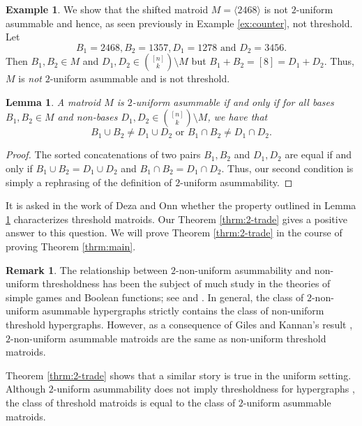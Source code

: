 \documentclass{amsart}
\theoremstyle{definition}
\newtheorem{remark}[defn]{Remark}
\newtheorem{example}[defn]{Example}
\theoremstyle{plain}
\newtheorem{lemma}[defn]{Lemma}
\begin{document}
\begin{example}
We show that the shifted matroid $M=\langle 2468 \rangle$ is not $2$-uniform asummable and hence, as seen previously in Example \ref{ex:counter}, not threshold. Let
\[B_1= 2468, B_2= 1357, D_1=1278 \text{ and } D_2=3456. \]
Then $B_1,B_2 \in M$ and $D_1,D_2 \in \binom{[n]}{k}\setminus M$ but $B_1+B_2 = [8]=D_1+D_2$. Thus, $M$ is \emph{not} $2$-uniform asummable and is not threshold. 
\end{example}

\begin{lemma}
\label{lem:ele}
A matroid $M$ is $2$-uniform asummable if and only if for all bases $B_1,B_2\in M$ and non-bases $D_1,D_2\in \binom{[n]}{k}\setminus M$, we have that
\[B_1\cup B_2 \neq D_1\cup D_2 \text{ or } B_1\cap B_2 \neq D_1 \cap D_2. \]
\end{lemma}
\begin{proof}
The sorted concatenations of two pairs $B_1,B_2$ and $D_1,D_2$ are equal if and only if $B_1 \cup B_2 = D_1\cup D_2$ and $B_1\cap B_2 = D_1\cap D_2$. Thus, our second condition is simply a rephrasing of the definition of $2$-uniform asummability. 
\end{proof}

It is asked in the work of Deza and Onn \cite[Question $1.1$]{DO} whether the property outlined in Lemma \ref{lem:ele} characterizes threshold matroids. Our Theorem \ref{thrm:2-trade} gives a positive answer to this question. We will prove Theorem \ref{thrm:2-trade} in the course of proving Theorem \ref{thrm:main}. 

\begin{remark}
  The relationship between $2$-non-uniform asummability and non-uniform thresholdness has been the subject of much study in the theories of simple games and Boolean functions; see \cite[Section $2.7$]{TZ} and \cite[Section $9.3$]{Boolean}. In general, the class of $2$-non-uniform asummable hypergraphs strictly contains the class of non-uniform threshold hypergraphs. However, as a consequence of Giles and Kannan's result \cite{GK}, $2$-non-uniform asummable matroids are the same as non-uniform threshold matroids.

  Theorem \ref{thrm:2-trade} shows that a similar story is true in the uniform setting. Although $2$-uniform asummability does not imply thresholdness for hypergraphs \cite[Section $6$]{DO}, the class of threshold matroids is equal to the class of $2$-uniform asummable matroids.
\end{remark}
\end{document}
